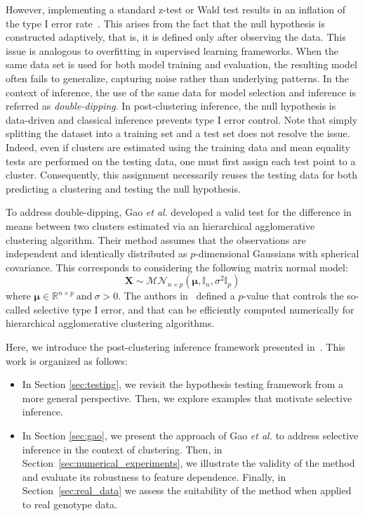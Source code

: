 \documentclass[a4paper,11pt]{article}
\theoremstyle{plain}
\newcommand{\1}{\mathbf{1}}
\begin{document}
However, implementing a standard z-test or Wald test results in an inflation of the type I error rate~\cite{Gao}. This arises from the fact that the null hypothesis is constructed adaptively, that is, it is defined only after observing the data. This issue is analogous to overfitting in supervised learning frameworks. When the same data set is used for both model training and evaluation, the resulting model often fails to generalize, capturing noise rather than underlying patterns. In the context of inference, the use of the same data for model selection and inference is referred as \textit{double-dipping}. In post-clustering inference, the null hypothesis is data-driven and classical inference prevents type I error control. Note that simply splitting the dataset into a training set and a test set does not resolve the issue. Indeed, even if clusters are estimated using the training data and mean equality tests are performed on the testing data, one must first assign each test point to a cluster. Consequently, this assignment necessarily reuses the testing data for both predicting a clustering and testing the null hypothesis. 

To address double-dipping, Gao \textit{et al}. developed a valid test for the difference in means between two clusters estimated via an hierarchical agglomerative clustering algorithm. Their method assumes that the observations are independent and identically distributed as $p$-dimensional Gaussians with spherical covariance. This corresponds to considering the following matrix normal model:
\begin{equation*}
  \mathbf{X}\sim\mathcal{MN}_{n\times p}(\boldsymbol{\mu},\mathbb{I}_n,\sigma^2\mathbb{I}_p)
\end{equation*}
where $\boldsymbol{\mu} \in\mathbb{R}^{n\times p} ~\text{and} ~\sigma > 0$.
The authors in~\cite{Gao} defined a $p$-value that controls the so-called selective type I error, and that can be efficiently computed numerically for hierarchical agglomerative clustering algorithms.

Here, we introduce the post-clustering inference framework presented in~\cite{Gao}. This work is organized as follows:
\begin{itemize}
    \item In Section \ref{sec:testing}, we revisit the hypothesis testing framework from a more general perspective. Then, we explore examples that motivate selective inference.
    \item In Section \ref{sec:gao}, we present the approach of Gao \textit{et al.} to address selective inference in the context of clustering. Then, in Section~\ref{sec:numerical_experiments}, we illustrate the validity of the method and evaluate its robustness  to feature dependence. Finally, in Section~\ref{sec:real_data} we assess the suitability of the method when applied to real genotype data.
\end{itemize}
\end{document}
